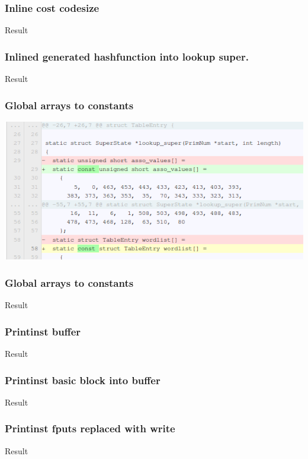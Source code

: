 \documentclass{beamer}
\begin{document}
\begin{frame}\frametitle{Inline cost codesize}
\begin{center}
Result
\end{center}
\end{frame}

\begin{frame}\frametitle{Inlined generated hashfunction into lookup super.}
\begin{center}
Result
\end{center}
\end{frame}

\begin{frame}\frametitle{Global arrays to constants}
\begin{center}
\includegraphics[scale=0.4]{shots/const.png}
\end{center}
\end{frame}

\begin{frame}\frametitle{Global arrays to constants}
\begin{center}
Result
\end{center}
\end{frame}

\begin{frame}\frametitle{Printinst buffer}
\begin{center}
Result
\end{center}
\end{frame}

\begin{frame}\frametitle{Printinst basic block into buffer}
\begin{center}
Result
\end{center}
\end{frame}

\begin{frame}\frametitle{Printinst fputs replaced with write}
\begin{center}
Result
\end{center}
\end{frame}
\end{document}
